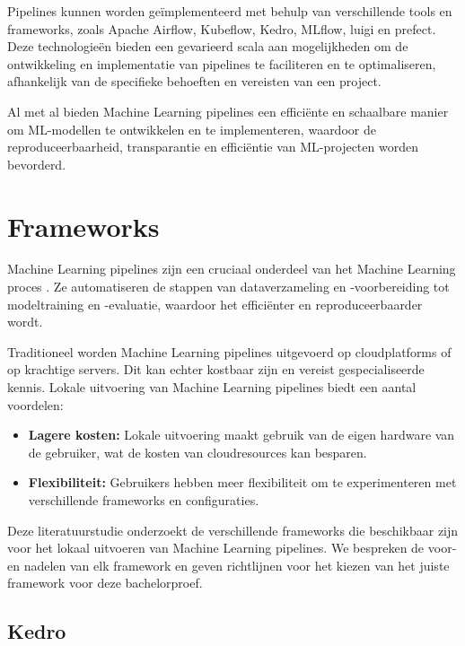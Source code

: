 Pipelines kunnen worden geïmplementeerd met behulp van verschillende tools en frameworks, zoals Apache Airflow, Kubeflow, Kedro, MLflow, luigi en prefect. Deze technologieën bieden een gevarieerd scala aan mogelijkheden om de ontwikkeling en implementatie van pipelines te faciliteren en te optimaliseren, afhankelijk van de specifieke behoeften en vereisten van een project.

Al met al bieden Machine Learning pipelines een efficiënte en schaalbare manier om ML-modellen te ontwikkelen en te implementeren, waardoor de reproduceerbaarheid, transparantie en efficiëntie van ML-projecten worden bevorderd.

\section{Frameworks}

Machine Learning pipelines zijn een cruciaal onderdeel van het Machine Learning proces \autocite{Jordan2015}. Ze automatiseren de stappen van dataverzameling en -voorbereiding tot modeltraining en -evaluatie, waardoor het efficiënter en reproduceerbaarder wordt.

Traditioneel worden Machine Learning pipelines uitgevoerd op cloudplatforms of op krachtige servers. Dit kan echter kostbaar zijn en vereist gespecialiseerde kennis. Lokale uitvoering van Machine Learning pipelines biedt een aantal voordelen:

\begin{itemize}
  \item \textbf{Lagere kosten:} Lokale uitvoering maakt gebruik van de eigen hardware van de gebruiker, wat de kosten van cloudresources kan besparen.
  \item \textbf{Flexibiliteit:} Gebruikers hebben meer flexibiliteit om te experimenteren met verschillende frameworks en configuraties.
\end{itemize}

Deze literatuurstudie onderzoekt de verschillende frameworks die beschikbaar zijn voor het lokaal uitvoeren van Machine Learning pipelines. We bespreken de voor- en nadelen van elk framework en geven richtlijnen voor het kiezen van het juiste framework voor deze bachelorproef.
\subsection{Kedro}

